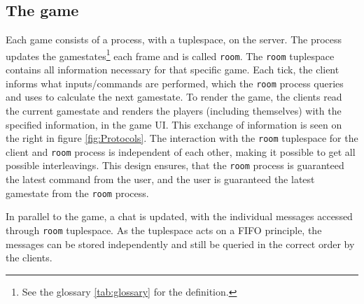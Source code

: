\subsection{The game}


Each game consists of a process, with a tuplespace, on the server. The process updates the gamestates\footnote{See the glossary \ref{tab:glossary} for the definition.} each frame and is called \texttt{room}. The \texttt{room} tuplespace contains all information necessary for that specific game. Each tick, the client informs what inputs/commands are performed, which the \texttt{room} process queries and uses to calculate the next gamestate. To render the game, the clients read the current gamestate and renders the players (including themselves) with the specified information, in the game UI. This exchange of information is seen on the right in figure \ref{fig:Protocols}. The interaction with the \texttt{room} tuplespace for the client and \texttt{room} process is independent of each other, making it possible to get all possible interleavings. This design ensures, that the \texttt{room} process is guaranteed the latest command from the user, and the user is guaranteed the latest gamestate from the \texttt{room} process.

In parallel to the game, a chat is updated, with the individual messages accessed through \texttt{room} tuplespace. As the tuplespace acts on a FIFO principle, the messages can be stored independently and still be queried in the correct order by the clients.




